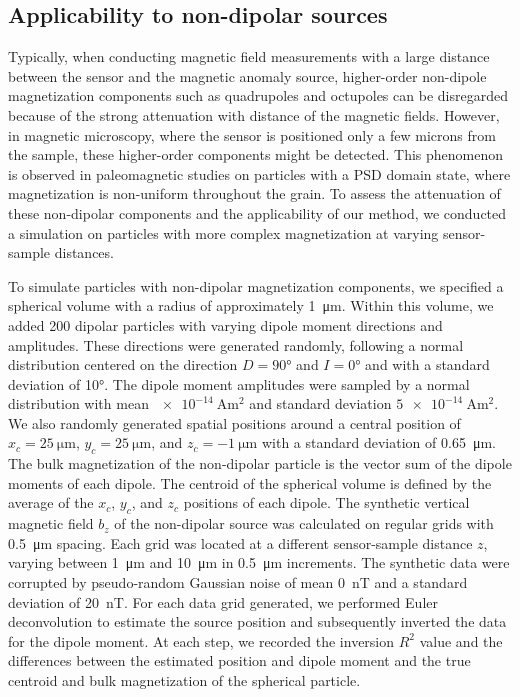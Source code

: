\subsection{Applicability to non-dipolar sources}

Typically, when conducting magnetic field measurements with a large distance between the sensor and the magnetic anomaly source, higher-order non-dipole magnetization components such as quadrupoles and octupoles can be disregarded because of the strong attenuation with distance of the magnetic fields.
However, in magnetic microscopy, where the sensor is positioned only a few microns from the sample, these higher-order components might be detected.
This phenomenon is observed in paleomagnetic studies on particles with a PSD domain state, where magnetization is non-uniform throughout the grain.
To assess the attenuation of these non-dipolar components and the applicability of our method, we conducted a simulation on particles with more complex magnetization at varying sensor-sample distances.

To simulate particles with non-dipolar magnetization components, we specified a spherical volume with a radius of approximately \qty{1}{\um}.
Within this volume, we added 200 dipolar particles with varying dipole moment directions and amplitudes.
These directions were generated randomly, following a normal distribution centered on the direction $D=\ang{90}$ and $I=\ang{0}$ and with a standard deviation of \ang{10}.
The dipole moment amplitudes were sampled by a normal distribution with mean $\qty{e-14}{\ampere\m\squared}$ and standard deviation $\qty{5e-14}{\ampere\m\squared}$.
We also randomly generated spatial positions around a central position of $x_c=\qty{25}{\um}$, $y_c=\qty{25}{\um}$, and $z_c=\qty{-1}{\um}$ with a standard deviation of \qty{0.65}{\um}.
The bulk magnetization of the non-dipolar particle is the vector sum of the dipole moments of each dipole.
The centroid of the spherical volume is defined by the average of the $x_c$, $y_c$, and $z_c$ positions of each dipole.
The synthetic vertical magnetic field $b_z$ of the non-dipolar source was calculated on regular grids with \qty{0.5}{\um} spacing.
Each grid was located at a different sensor-sample distance $z$, varying between \qty{1}{\um} and \qty{10}{\um} in \qty{0.5}{\um} increments.
The synthetic data were corrupted by pseudo-random Gaussian noise of mean \qty{0}{\nano\tesla} and a standard deviation of \qty{20}{\nano\tesla}.
For each data grid generated, we performed Euler deconvolution to estimate the source position and subsequently inverted the data for the dipole moment.
At each step, we recorded the inversion $R^2$ value and the differences between the estimated position and dipole moment and the true centroid and bulk magnetization of the spherical particle.

